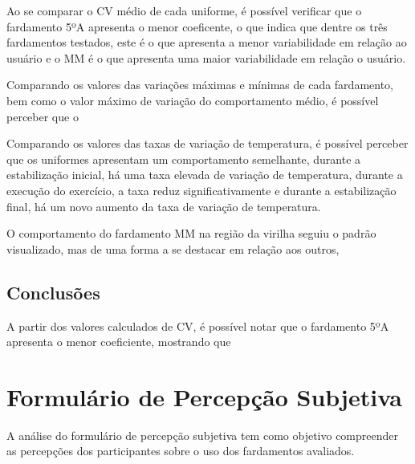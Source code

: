
Ao se comparar o \acrlong{CV} médio de cada uniforme, é possível verificar que o fardamento 5ºA apresenta 
o menor coeficente, o que indica que dentre os três fardamentos testados, este é o que apresenta a menor 
variabilidade em relação ao usuário e o \acrlong{MM} é o que apresenta uma maior variabilidade em relação 
o usuário.

Comparando os valores das variações máximas e mínimas de cada fardamento, bem como o valor máximo de variação 
do comportamento médio, é possível perceber que o 

Comparando os valores das taxas de variação de temperatura, é possível perceber que os uniformes 
apresentam um comportamento semelhante, durante a estabilização inicial, há uma taxa elevada de 
variação de temperatura, durante a execução do exercício, a taxa reduz significativamente e durante a 
estabilização final, há um novo aumento da taxa de variação de temperatura.

O comportamento do fardamento \acrshort{MM} na região da virilha seguiu o padrão visualizado, mas de uma forma 
a se destacar em relação aos outros,  


\subsection{Conclusões}
A partir dos valores calculados de \acrlong{CV}, é possível notar que o fardamento 5ºA apresenta 
o menor coeficiente, mostrando que 

\section{Formulário de Percepção Subjetiva}
A análise do formulário de percepção subjetiva tem como objetivo compreender as percepções dos participantes sobre o uso dos fardamentos avaliados. 

